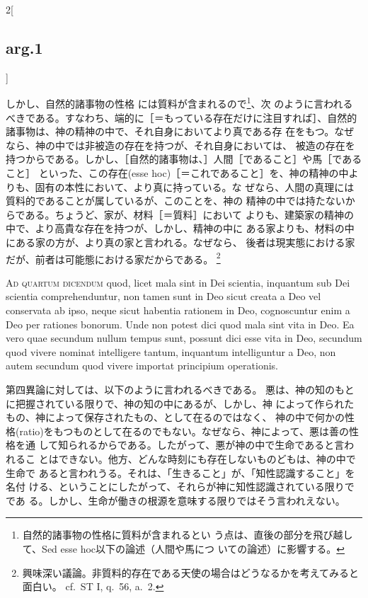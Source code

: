 \documentclass[paper=a4paper,fontsize=10pt,jafontsize=9pt,titlepage]{jlreq}
\begin{document}
\begin{paracol}{2}[\subsection{arg.1}]
\switchcolumn

しかし、自然的諸事物の性格
 には質料が含まれるので\footnote{自然的諸事物の性格に質料が含まれるとい
 う点は、直後の部分を飛び越して、Sed esse hoc以下の論述（人間や馬につ
 いての論述）に影響する。}、次
 のように言われるべきである。すなわち、端的に［＝もっている存在だけに注目すれば］、自然的諸事物は、神の精神の中で、それ自身においてより真である存
 在をもつ。なぜなら、神の中では非被造の存在を持つが、それ自身においては、
 被造の存在を持つからである。しかし、［自然的諸事物は、］人間［であること］や馬［であること］
 といった、この存在(esse hoc)［＝これであること］を、神の精神の中よりも、固有の本性において、より真に持っている。な
 ぜなら、人間の真理には質料的であることが属しているが、このことを、神の
 精神の中では持たないからである。ちょうど、家が、材料［＝質料］において
 よりも、建築家の精神の中で、より高貴な存在を持つが、しかし、精神の中に
 ある家よりも、材料の中にある家の方が、より真の家と言われる。なぜなら、
 後者は現実態における家だが、前者は可能態における家だからである。
 \footnote{興味深い議論。非質料的存在である天使の場合はどうなるかを考えてみると面白い。
 cf.~ST I, q.~56, a.~2.}

\switchcolumn*[\subsection{ad.4}]


{\scshape Ad quartum dicendum} quod, licet mala sint in
 Dei scientia, inquantum sub Dei scientia comprehenduntur, non tamen
 sunt in Deo sicut creata a Deo vel conservata ab ipso, neque sicut
 habentia rationem in Deo, cognoscuntur enim a Deo per rationes
 bonorum. Unde non potest dici quod mala sint vita in Deo. Ea vero quae
 secundum nullum tempus sunt, possunt dici esse vita in Deo, secundum
 quod vivere nominat intelligere tantum, inquantum intelliguntur a Deo,
 non autem secundum quod vivere importat principium operationis.

\switchcolumn

第四異論に対しては、以下のように言われるべきである。
悪は、神の知のもとに把握されている限りで、神の知の中にあるが、しかし、神
 によって作られたもの、神によって保存されたもの、として在るのではなく、
 神の中で何かの性格(ratio)をもつものとして在るのでもない。なぜなら、神によって、悪は善の性格を通
 して知られるからである。したがって、悪が神の中で生命であると言われるこ
 とはできない。他方、どんな時刻にも存在しないものどもは、神の中で生命で
 あると言われうる。それは、「生きること」が、「知性認識すること」を名付
 ける、ということにしたがって、それらが神に知性認識されている限りでであ
 る。しかし、生命が働きの根源を意味する限りではそう言われえない。

\end{paracol}
\end{document}
